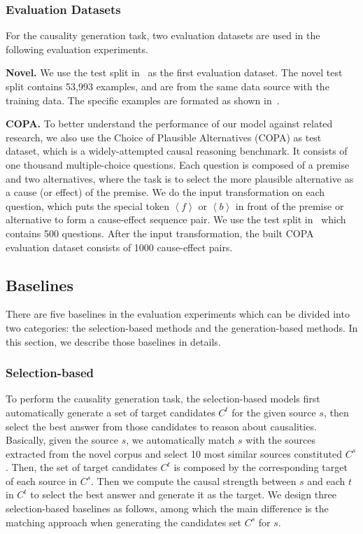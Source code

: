 \subsubsection{Evaluation Datasets}
For the causality generation task, two evaluation datasets are used in the following evaluation experiments.

\textbf{Novel.}
We use the test split in~ as the first evaluation dataset.
The novel test split contains 53,993 examples, and are
from the same data source with the training data.
The specific examples are formated as shown in~. 

\textbf{ COPA.}
To better understand the performance of our model against related research, we also use 
the Choice of Plausible Alternatives (COPA) 
as test dataset, which is a widely-attempted causal reasoning benchmark. It consists
of one thousand multiple-choice questions.
Each question is composed of a premise and two alternatives,
where the task is to select the more plausible alternative as a cause (or effect) of the premise. 
We do the input transformation on each question, 
which puts the special token $\left< f\right>$ or $\left< b\right>$ in front of the premise or alternative to form a cause-effect sequence pair.
We use the test split in~\cite{gordon2011commonsense}
which contains 500 questions.
After the input transformation,
the built COPA evaluation dataset consists of 1000 cause-effect pairs. 


\subsection{Baselines}
There are five baselines in the evaluation experiments
which can be divided into two categories:
the selection-based methods and the generation-based methods. 
In this section, we describe those baselines in details.

\subsubsection{Selection-based}
To perform the causality generation task, the selection-based models first automatically generate a set of target candidates $C^t$ for the given source $s$, then
select the best answer from those candidates to reason about causalities. 
Basically, given the source $s$, we automatically
match $s$ with the sources extracted from the novel 
corpus and select 10 most similar sources constituted $C^s$. 
Then, the set of target candidates $C^t$ is composed by the corresponding target of each source in $C^s$.
Then we compute the causal strength between 
$s$ and each $t$ in $C^t$ to select the best answer 
and generate it as the target.
We design three selection-based baselines as follows,
among which the main difference is 
the matching approach when generating the candidates set $C^s$ for $s$.

